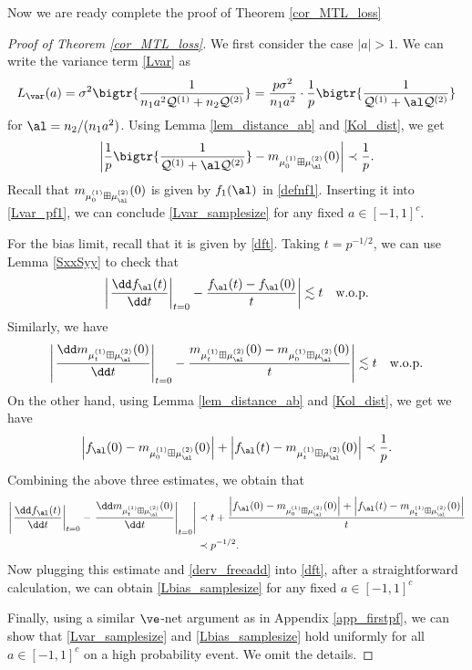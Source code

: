 \documentclass[aos,preprint]{imsart}
\newcommand{\Qa}{\mathcal Q^{(1)}}
\newcommand{\Qb}{\mathcal Q^{(2)}}
\newcommand{\mua}{\mu^{(1)}}
\newcommand{\mub}{\mu^{(2)}}
\begin{document}
Now we are ready complete the proof of Theorem \ref{cor_MTL_loss}
\begin{proof}[Proof of Theorem \ref{cor_MTL_loss}]
We first consider the case $|a|> 1$. We can write the variance term \eqref{Lvar} as
\begin{align}\label{Lvar_pf1}
L_{\var}(a)= \sigma^2 \bigtr{ \frac1{n_1 a^2\Qa+n_2\Qb}}= \frac{p\sigma^2}{n_1 a^2}\cdot \frac{1}{p}\bigtr{ \frac1{ \Qa+\al \Qb}}
\end{align}
for $\al= n_2/(n_1 a^2)$. Using Lemma \ref{lem_distance_ab} and \eqref{Kol_dist}, we get
 $$\left|\frac{1}{p}\bigtr{\frac{1}{\Qa+  \al \Qb}} - m_{\mua_0 \boxplus \mub_\al}(0)\right|  \prec \frac1p.$$
 Recall that $m_{\mua_0\boxplus \mub_\al}(0) $ is given by $f_1(\al)$ in \eqref{defnf1}. Inserting it into \eqref{Lvar_pf1}, we can conclude \eqref{Lvar_samplesize} for any fixed $a\in [-1,1]^c$. 
 
 For the bias limit, recall that it is given by \eqref{dft}. Taking $t=p^{-1/2}$, we can use Lemma \ref{SxxSyy} to check that  
$$ \left| \left. \frac{\dd  f_\al (t)}{\dd t}\right|_{t=0} - \frac{f_\al(t)-f_\al(0)}{t}\right| \lesssim t \quad \text{w.o.p.}$$
Similarly, we have 
 $$ \left| \left. \frac{\dd  m_{\mua_t\boxplus \mub_\al}(0)}{\dd t}\right|_{t=0} - \frac{m_{\mua_t\boxplus \mub_\al}(0)-m_{\mua_0\boxplus \mub_\al}(0)}{t}\right| \lesssim t \quad \text{w.o.p.}$$
On the other hand, using Lemma \ref{lem_distance_ab} and \eqref{Kol_dist}, we get we have  
  $$\left|f_\al(0) - m_{\mua_0 \boxplus \mub_\al}(0)\right| + \left|f_\al(t) - m_{\mua_t \boxplus \mub_\al}(0)\right|  \prec \frac1p.$$
 Combining the above three estimates, we obtain that 
 \begin{align*}
 \left| \left. \frac{\dd  f_\al (t)}{\dd t}\right|_{t=0} -\left. \frac{\dd  m_{\mua_t\boxplus \mub_\al}(0)}{\dd t}\right|_{t=0} \right|&\prec t + \frac{\left|f_\al(0) - m_{\mua_0 \boxplus \mub_\al}(0)\right| + \left|f_\al(t) - m_{\mua_t \boxplus \mub_\al}(0)\right| }{t} \\
 &\prec p^{-1/2}.
 \end{align*}
 Now plugging this estimate and \eqref{derv_freeadd} into \eqref{dft}, after a straightforward calculation, we can obtain \eqref{Lbias_samplesize} for any fixed $a\in [-1,1]^c$
   
Finally, using a similar $\ve$-net argument as in Appendix \ref{app_firstpf}, we can show that \eqref{Lvar_samplesize} and \eqref{Lbias_samplesize} hold uniformly for all $a\in [-1,1]^c$ on a high probability event. We omit the details.


\end{proof}
\end{document}
